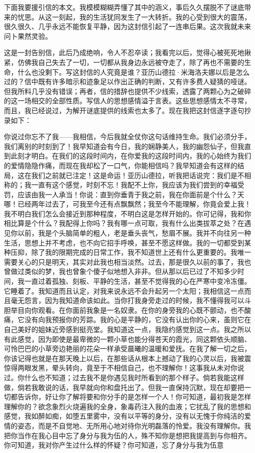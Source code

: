 \documentclass[12pt, UTF8]{ctexbook}
\begin{document}
\par 下面我要援引信的本文。我模模糊糊弄懂了其中的涵义，事后久久摆脱不了谜底带来的忧思。从这一刻起，我的生活犹同发生了一大转折。我的心受到很大的震荡，很久很久、几乎永远不能恢复平静，因为这封信引起了一连串后果。这次我就未来问卜果然灵验。
\par 这是一封告别信，此后乃成绝响，令人不忍卒读；我看完以后，觉得心被死死地揪紧，仿佛我自己失去了一切，一切都从我身边永远被夺走了，除了再也不需要的生命，什么也没剩下。写这封信的人究竟是谁？亚历山德拉·米海洛夫娜以后是怎么过的？信中既有许多暗示和迹象足以作出正确的判断，又有许多费人疑猜的哑谜。但我所料几乎没有错误；再者，信的措辞也提供不少线索，透露了两颗心为之破碎的这一场相交的全部性质。写信人的思想感情溢于言表。这些思想感情太不寻常，而且，我已经说过，为解开谜底提供的线索也太多了。现在我把这封信逐字逐句抄录如下：
\par 你说过你忘不了我——我相信，今后我就全仗你这句话维持生命。我们必须分手，我们离别的时刻到了！我早知道会有今日，我的娴静美人，我的幽怨仙子，但我直到此刻才明白。在我们的这段时间内，在你爱我的这段时间内，我的心始终为我们的爱情隐隐作痛，而现在我却松了一口气，你能相信吗？我早知道会有这样的结局，这在我们之前就已注定！这是命运！亚历山德拉，听我把话说完：我们是不相称的；我一直有这个感觉，时刻不忘！我配不上你，我应该为我们尝到的幸福受罚，应该由我一人承当！你说：直到你垂青于我之前，我在你面前是个什么？天哪！已经两年过去了，可我至今还有点飘飘然；我至今不能理解，你竟会爱上我！我不明白我们怎么会接近到那种程度，不明白这是怎样开始的。你可记得，我和你相比算是个什么？我配得上你吗？我有哪一点可取，我有什么出类拔萃之处？在遇见你以前，我是个头脑简单的粗人，老是垂头丧气，愁眉不展。我并不向往另一种生活，思想上并不考虑，也不向它招手呼唤，甚至不愿这样做。我的一切都受到某种压抑，除了我的限期完成的日常工作，我不知道世上还有什么更重要的。我唯一需要关心的只是明天，其实对此我也相当淡然。过去，那是很久以前的事了，我也曾做过类似的梦，我也曾象个傻子似地想入非非。但从那以后已过了不知多少时间，我一直过着孤独、刻板、平静的生活，甚至不觉得我的心在严寒中变冷冻僵。它睡着了。我知道而且认定，对我来说永远不会升起另一个太阳；我相信这一点而且毫无怨言，因为我知道命该如此。当你打我身旁走过的时候，我不懂得我可以斗胆举目向你观看。在你面前我象是一名奴隶。在你的身旁我的心既不颤动，也不酸痛，它没有向我预报你的芳踪。我的心是平静的，它没有认出你的心来，虽则它在自己美好的姐妹近旁感到挺亮堂。我知道这一点，我隐约感觉到这一点。我之所以有此感觉，因为即使是最卑微的一颗小草也能分得苍天的霞光，同这颗依头顺脑、可怜巴巴的小草旁边艳丽的花朵一样承受晨曦的温暖和爱抚。在我了解一切之后，你该记得也就是在那天晚上以后，在那些话从根本上撼动了我的心灵以后，我被震惊得两眼发黑，晕头转向，竟至于不相信自己，也不理解你！这事我从未对你说过。你什么也不知道；过去我不是你遇见我时所看到的那个样子。倘若我能这样做，倘若我敢说的话，我早就向你和盘托出了。但我一直保持沉默，现在却要把一切都告诉你，好让你了解将要和你分手的是怎样一个人！你可知道，最初我是怎样理解你的？欲念象烈火烧遍我的全身，象毒药注入我的血液；它扰乱了我的思想和感觉，我如醉如痴，如堕五里雾中，没有以平等的身分，没有以无愧于你纯洁的爱情的姿态，而是不自觉地、无所用心地对待你光明磊落的怜爱。我没有理解你。我把你当作在我心目中忘了身分与我为伍的人，殊不知你是想把我提高到与你相齐。你可知道，我对你产生过什么样的怀疑？你可知道，忘了身分与我为伍意
\end{document}
